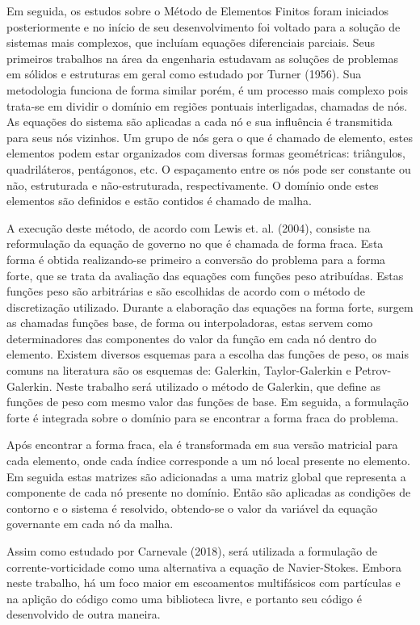 Em seguida, os estudos sobre o Método de Elementos Finitos foram iniciados posteriormente e no início de seu desenvolvimento foi voltado para a solução de sistemas mais complexos, que incluíam equações diferenciais parciais.
Seus primeiros trabalhos na área da engenharia estudavam as soluções de problemas em sólidos e estruturas em geral como estudado por Turner (1956)\cite{Turner-1956}.
Sua metodologia funciona de forma similar porém, é um processo mais complexo pois trata-se em dividir o domínio em regiões pontuais interligadas, chamadas de nós.
As equações do sistema são aplicadas a cada nó e sua influência é transmitida para seus nós vizinhos.
Um grupo de nós gera o que é chamado de elemento, estes elementos podem estar organizados com diversas formas geométricas: triângulos, quadriláteros, pentágonos, etc.
O espaçamento entre os nós pode ser constante ou não, estruturada e não-estruturada, respectivamente.
O domínio onde estes elementos são definidos e estão contidos é chamado de malha.

A execução deste método, de acordo com Lewis et. al. (2004)\cite{lewis}, consiste na reformulação da equação de governo no que é chamada de forma fraca.
Esta forma é obtida realizando-se primeiro a conversão do problema para a forma forte, que se trata da avaliação das equações com funções peso atribuídas.
Estas funções peso são arbitrárias e são escolhidas de acordo com o método de discretização utilizado.
Durante a elaboração das equações na forma forte, surgem as chamadas funções base, de forma ou interpoladoras, estas servem como determinadores das componentes do valor da função em cada nó dentro do elemento.
Existem diversos esquemas para a escolha das funções de peso, os mais comuns na literatura são os esquemas de: Galerkin, Taylor-Galerkin e Petrov-Galerkin.
Neste trabalho será utilizado o método de Galerkin, que define as funções de peso com mesmo valor das funções de base.
Em seguida, a formulação forte é integrada sobre o domínio para se encontrar a forma fraca do problema.

Após encontrar a forma fraca, ela é transformada em sua versão matricial para cada elemento, onde cada índice corresponde a um nó local presente no elemento.
Em seguida estas matrizes são adicionadas a uma matriz global que representa a componente de cada nó presente no domínio.
Então são aplicadas as condições de contorno e o sistema é resolvido, obtendo-se o valor da variável da equação governante em cada nó da malha.

Assim como estudado por Carnevale (2018)\cite{carnevale}, será utilizada a formulação de corrente-vorticidade como uma alternativa a equação de Navier-Stokes.
Embora neste trabalho, há um foco maior em escoamentos multifásicos com partículas e na aplição do código como uma biblioteca livre, e portanto seu código é desenvolvido de outra maneira.

